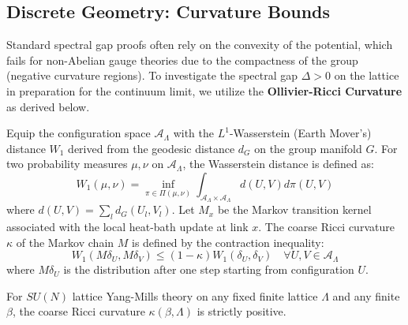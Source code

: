 \subsection{Discrete Geometry: Curvature Bounds}

Standard spectral gap proofs often rely on the convexity of the potential, which fails for non-Abelian gauge theories due to the compactness of the group (negative curvature regions). To investigate the spectral gap $\Delta > 0$ on the lattice in preparation for the continuum limit, we utilize the \textbf{Ollivier-Ricci Curvature} as derived below.

\begin{definition}
Equip the configuration space $\mathcal{A}_\Lambda$ with the $L^1$-Wasserstein (Earth Mover's) distance $W_1$ derived from the geodesic distance $d_G$ on the group manifold $G$. For two probability measures $\mu, \nu$ on $\mathcal{A}_\Lambda$, the Wasserstein distance is defined as:
\[
W_1(\mu, \nu) = \inf_{\pi \in \Pi(\mu, \nu)} \int_{\mathcal{A}_\Lambda \times \mathcal{A}_\Lambda} d(U, V) d\pi(U, V)
\]
where $d(U, V) = \sum_{l} d_G(U_l, V_l)$.
Let $M_x$ be the Markov transition kernel associated with the local heat-bath update at link $x$. The coarse Ricci curvature $\kappa$ of the Markov chain $M$ is defined by the contraction inequality:
\begin{equation}
W_1(M \delta_U, M \delta_V) \le (1 - \kappa) W_1(\delta_U, \delta_V) \quad \forall U, V \in \mathcal{A}_\Lambda
\end{equation}
where $M \delta_U$ is the distribution after one step starting from configuration $U$.
\end{definition}

\begin{theorem}
For $SU(N)$ lattice Yang-Mills theory on any fixed finite lattice $\Lambda$ and any finite $\beta$, the coarse Ricci curvature $\kappa(\beta, \Lambda)$ is strictly positive.
\end{theorem}

